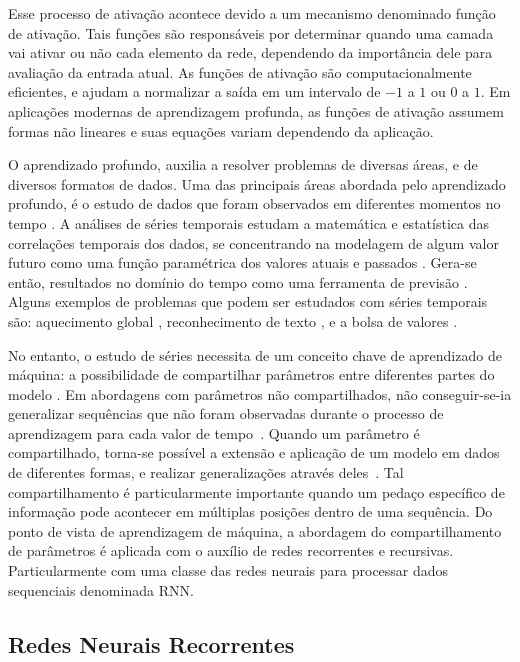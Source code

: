 Esse processo de ativação acontece devido a um mecanismo denominado função de ativação. Tais funções são responsáveis por determinar quando uma camada vai ativar ou não cada elemento da rede, dependendo da importância dele para avaliação da entrada atual. As funções de ativação são computacionalmente eficientes, e ajudam a normalizar a saída em um intervalo de $-1$ a $1$ ou $0$ a $1$. Em aplicações modernas de aprendizagem profunda, as funções de ativação assumem formas não lineares e suas equações variam dependendo da aplicação.

O aprendizado profundo, auxilia a resolver problemas de diversas áreas, e de diversos formatos de dados. Uma das principais áreas abordada pelo aprendizado profundo, é o estudo de dados que foram observados em diferentes momentos no tempo \cite{shumway2017time}. A análises de séries temporais estudam a matemática e estatística das correlações temporais dos dados, se concentrando na modelagem de algum valor futuro como uma função paramétrica dos valores atuais e passados \cite{shumway2017time}. Gera-se então, resultados no domínio do tempo como uma ferramenta de previsão \cite{shumway2017time}. Alguns exemplos de problemas que podem ser estudados com séries temporais são: aquecimento global \cite{rolnick2019tackling}, reconhecimento de texto \cite{radford2019language}, e a bolsa de valores \cite{forecasting_returns}.

No entanto, o estudo de séries necessita de um conceito chave de aprendizado de máquina: a possibilidade de compartilhar parâmetros entre diferentes partes do modelo \cite{deep_learning}. Em abordagens com parâmetros não compartilhados, não conseguir-se-ia generalizar sequências que não foram observadas durante o processo de aprendizagem para cada valor de tempo~\cite{deep_learning}. Quando um parâmetro é compartilhado, torna-se possível a extensão e aplicação de um modelo em dados de diferentes formas, e realizar generalizações através deles~\cite{deep_learning}. Tal compartilhamento é particularmente importante quando um pedaço específico de informação pode acontecer em múltiplas posições dentro de uma sequência. Do ponto de vista de aprendizagem de máquina, a abordagem do compartilhamento de parâmetros é aplicada com o auxílio de redes recorrentes e recursivas. Particularmente com uma classe das redes neurais para processar dados sequenciais denominada \acrlong{RNN}.

\subsection{Redes Neurais Recorrentes}

